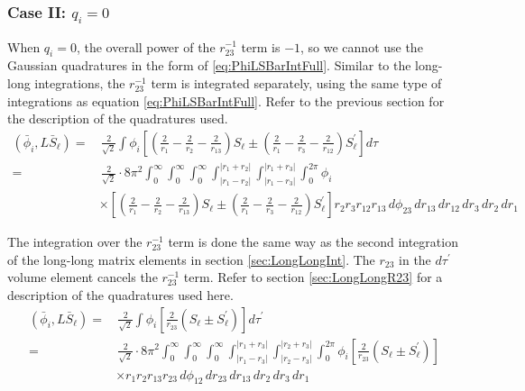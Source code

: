 \documentclass[Dissertation.tex]{subfiles}
\begin{document}
\subsubsection{Case II: \texorpdfstring{$q_i = 0$}{qi = 0}}
When $q_i = 0$, the overall power of the $r_{23}^{-1}$ term is $-1$, so we cannot use the Gaussian quadratures in the form of \ref{eq:PhiLSBarIntFull}.  Similar to the long-long integrations, the $r_{23}^{-1}$ term is integrated separately, using the same type of integrations as equation \ref{eq:PhiLSBarIntFull}.  Refer to the previous section for the description of the quadratures used.
\begin{align}
\label{eq:PhiLSBarIntNoR23}
\nonumber (\bar{\phi}_i, L\bar{S}_\ell) =& \,\frac{2}{\sqrt{2}} \int \phi_i \left[ \left( \frac{2}{r_1} - \frac{2}{r_2} - \frac{2}{r_{13}} \right)S_\ell \pm \left( \frac{2}{r_1} - \frac{2}{r_3} - \frac{2}{r_{12}} \right) S_\ell^\prime \right]  d\tau \\
=&\, \frac{2}{\sqrt{2}} \cdot 8\pi^2  \int_0^\infty \int_0^\infty \int_0^\infty \int_{|r_1 - r_2|}^{|r_1 + r_2|} \int_{|r_1 - r_3|}^{|r_1 + r_3|} \int_0^{2\pi} \phi_i \\
&\times \left[ \left( \frac{2}{r_1} - \frac{2}{r_2} - \frac{2}{r_{13}} \right)S_\ell \pm \left( \frac{2}{r_1} - \frac{2}{r_3} - \frac{2}{r_{12}} \right) S_\ell^\prime \right]  r_2 r_3 r_{12} r_{13}\, d\phi_{23}\, dr_{13}\, dr_{12}\, dr_3\, dr_2\, dr_1
\end{align}

The integration over the $r_{23}^{-1}$ term is done the same way as the second integration of the long-long matrix elements in section \ref{sec:LongLongInt}.  The $r_{23}$ in the $d\tau^\prime$ volume element cancels the $r_{23}^{-1}$ term.  Refer to section \ref{sec:LongLongR23} for a description of the quadratures used here.
\begin{align}
\label{eq:PhiLSBarIntR23}
(\bar{\phi}_i, L\bar{S}_\ell) =& \,\frac{2}{\sqrt{2}} \int \phi_i \left[ \frac{2}{r_{23}}\left(S_\ell \pm S_\ell^\prime\right) \right] d\tau^\prime  \nonumber \\
=&\, \frac{2}{\sqrt{2}} \cdot 8\pi^2  \int_0^\infty \int_0^\infty \int_0^\infty \int_{|r_1 - r_3|}^{|r_1 + r_3|} \int_{|r_2 - r_3|}^{|r_2 + r_3|} \int_0^{2\pi} \phi_i \left[ \frac{2}{r_{23}}\left(S_\ell \pm S_\ell^\prime\right) \right]  \nonumber \\
&\times  r_1 r_2 r_{13} r_{23}\, d\phi_{12}\, dr_{23}\, dr_{13}\, dr_2\, dr_3\, dr_1
\end{align}
\end{document}
